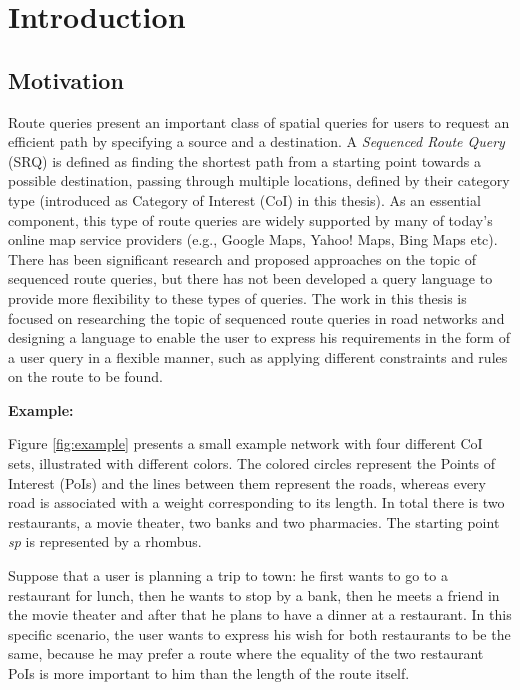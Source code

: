 \chapter{Introduction}
\label{sec:intro}

\section{Motivation}
\label{sec:motivation}
Route queries present an important class of spatial queries for users to request an efficient path by specifying a source and a destination. A \textit{Sequenced Route Query} (SRQ) is defined as finding the shortest path from a starting point towards a possible destination, passing through multiple locations, defined by their category type (introduced as Category of Interest (CoI) in this thesis). As an essential component, this type of route queries are widely supported by many of today's online map service providers (e.g., Google Maps, Yahoo! Maps, Bing Maps etc). There has been significant research and proposed approaches on the topic of sequenced route queries, but there has not been developed a query language to provide more flexibility to these types of queries. The work in this thesis is focused on researching the topic of sequenced route queries in road networks and designing a language to enable the user to express his requirements in the form of a user query in a flexible manner, such as applying different constraints and rules on the route to be found.

\textbf{Example:}

Figure \ref{fig:example} presents a small example network with four different CoI sets, illustrated with different colors. The colored circles represent the Points of Interest (PoIs) and the lines between them represent the roads, whereas every road is associated with a weight corresponding to its length. In total there is two restaurants, a movie theater, two banks and two pharmacies. The starting point \textit{sp} is represented by a rhombus.

Suppose that a user is planning a trip to town: he first wants to go to a restaurant for lunch, then he wants to stop by a bank, then he meets a friend in the movie theater and after that he plans to have a dinner at a restaurant. In this specific scenario, the user wants to express his wish for both restaurants to be the same, because he may prefer a route where the equality of the two restaurant PoIs is more important to him than the length of the route itself.

